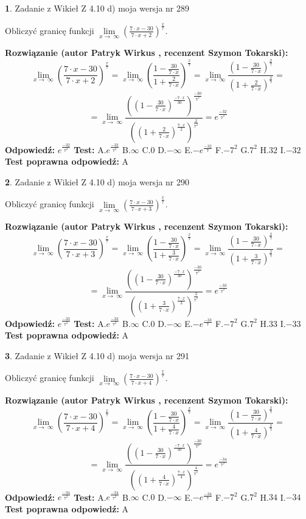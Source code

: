 \documentclass[12pt, a4paper]{article}
\theoremstyle{definition} %
\newtheorem{zad}{}
\newcommand{\zadStart}[1]{\begin{zad}#1\newline}
\newcommand{\zadStop}{\end{zad}}
\newcommand{\rozwStart}[2]{\noindent \textbf{Rozwiązanie (autor #1 , recenzent #2): }\newline}
\newcommand{\rozwStop}{\newline}
\newcommand{\odpStart}{\noindent \textbf{Odpowiedź:}\newline}
\newcommand{\odpStop}{\newline}
\newcommand{\testStart}{\noindent \textbf{Test:}\newline}
\newcommand{\testStop}{\newline}
\newcommand{\kluczStart}{\noindent \textbf{Test poprawna odpowiedź:}\newline}
\newcommand{\kluczStop}{\newline}
\begin{document}
\zadStart{Zadanie z Wikieł Z 4.10 d) moja wersja nr 289}


Obliczyć granicę funkcji  $\lim\limits_{x\to\ \infty}(\frac{7\cdot x-30}{7\cdot x+2})^{\frac{x}{7}}$.
\zadStop
\rozwStart{Patryk Wirkus}{Szymon Tokarski}
$$\lim\limits_{x\to\ \infty}(\frac{7\cdot x-30}{7\cdot x+2})^{\frac{x}{7}} = \lim\limits_{x\to\ \infty}(\frac{1-\frac{30}{7\cdot x}}{1+\frac{2}{7\cdot x}})^{\frac{x}{7}}=\lim\limits_{x\to\ \infty}\frac{(1-\frac{30}{7\cdot x})^{\frac{x}{7}}}{(1+\frac{2}{7\cdot x})^{\frac{x}{7}}}=$$
$$=\lim\limits_{x\to\ \infty}\frac{((1-\frac{30}{7\cdot x})^{\frac{-7\cdot x}{30}})^{\frac{-30}{7^{2}}}}{((1+\frac{2}{7\cdot x})^{\frac{7\cdot x}{2}})^{\frac{2}{7^{2}}}}=e^{\frac{-32}{7^{2}}}$$
\rozwStop
\odpStart
$e^{\frac{-32}{7^{2}}}$
\odpStop
\testStart
A.$e^{\frac{-32}{7^{2}}}$ B.$\infty$ C.$0$ D.$-\infty$ E.$-e^{\frac{-32}{7}}$
F.$-7^{2}$ G.$7^{2}$
H.$32$
I.$-32$
\testStop
\kluczStart
A
\kluczStop



\zadStart{Zadanie z Wikieł Z 4.10 d) moja wersja nr 290}


Obliczyć granicę funkcji  $\lim\limits_{x\to\ \infty}(\frac{7\cdot x-30}{7\cdot x+3})^{\frac{x}{7}}$.
\zadStop
\rozwStart{Patryk Wirkus}{Szymon Tokarski}
$$\lim\limits_{x\to\ \infty}(\frac{7\cdot x-30}{7\cdot x+3})^{\frac{x}{7}} = \lim\limits_{x\to\ \infty}(\frac{1-\frac{30}{7\cdot x}}{1+\frac{3}{7\cdot x}})^{\frac{x}{7}}=\lim\limits_{x\to\ \infty}\frac{(1-\frac{30}{7\cdot x})^{\frac{x}{7}}}{(1+\frac{3}{7\cdot x})^{\frac{x}{7}}}=$$
$$=\lim\limits_{x\to\ \infty}\frac{((1-\frac{30}{7\cdot x})^{\frac{-7\cdot x}{30}})^{\frac{-30}{7^{2}}}}{((1+\frac{3}{7\cdot x})^{\frac{7\cdot x}{3}})^{\frac{3}{7^{2}}}}=e^{\frac{-33}{7^{2}}}$$
\rozwStop
\odpStart
$e^{\frac{-33}{7^{2}}}$
\odpStop
\testStart
A.$e^{\frac{-33}{7^{2}}}$ B.$\infty$ C.$0$ D.$-\infty$ E.$-e^{\frac{-33}{7}}$
F.$-7^{2}$ G.$7^{2}$
H.$33$
I.$-33$
\testStop
\kluczStart
A
\kluczStop



\zadStart{Zadanie z Wikieł Z 4.10 d) moja wersja nr 291}


Obliczyć granicę funkcji  $\lim\limits_{x\to\ \infty}(\frac{7\cdot x-30}{7\cdot x+4})^{\frac{x}{7}}$.
\zadStop
\rozwStart{Patryk Wirkus}{Szymon Tokarski}
$$\lim\limits_{x\to\ \infty}(\frac{7\cdot x-30}{7\cdot x+4})^{\frac{x}{7}} = \lim\limits_{x\to\ \infty}(\frac{1-\frac{30}{7\cdot x}}{1+\frac{4}{7\cdot x}})^{\frac{x}{7}}=\lim\limits_{x\to\ \infty}\frac{(1-\frac{30}{7\cdot x})^{\frac{x}{7}}}{(1+\frac{4}{7\cdot x})^{\frac{x}{7}}}=$$
$$=\lim\limits_{x\to\ \infty}\frac{((1-\frac{30}{7\cdot x})^{\frac{-7\cdot x}{30}})^{\frac{-30}{7^{2}}}}{((1+\frac{4}{7\cdot x})^{\frac{7\cdot x}{4}})^{\frac{4}{7^{2}}}}=e^{\frac{-34}{7^{2}}}$$
\rozwStop
\odpStart
$e^{\frac{-34}{7^{2}}}$
\odpStop
\testStart
A.$e^{\frac{-34}{7^{2}}}$ B.$\infty$ C.$0$ D.$-\infty$ E.$-e^{\frac{-34}{7}}$
F.$-7^{2}$ G.$7^{2}$
H.$34$
I.$-34$
\testStop
\kluczStart
A
\kluczStop
\end{document}

